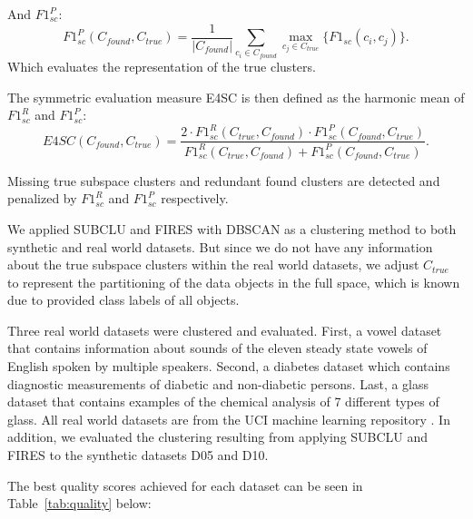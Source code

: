And $F1^{P}_{sc}$:
\begin{equation}
F1^{P}_{sc}(C_{found},C_{true}) = \frac{1}{|C_{found}|} \sum _{c_{i}\in C_{found}} \max _{c_{j}\in C_{true}} \{F1_{sc}(c_{i},c_{j})\}.
\end{equation}
Which evaluates the representation of the true clusters.  

The symmetric evaluation measure E4SC is then defined as the harmonic mean of $F1^{R}_{sc}$ and $F1^{P}_{sc}$:
\begin{equation}
E4SC(C_{found},C_{true}) = \frac{2\cdot F1^{R}_{sc}(C_{true},C_{found})\cdot F1^{P}_{sc}(C_{found},C_{true})}{F1^{R}_{sc}(C_{true},C_{found}) + F1^{P}_{sc}(C_{found},C_{true})}.
\end{equation}

Missing true subspace clusters and redundant found clusters are detected and penalized by $F1^{R}_{sc}$ and $F1^{P}_{sc}$ respectively. 

We applied SUBCLU and FIRES with DBSCAN as a clustering method to both synthetic and real world datasets. But since we do not have any information about the true subspace clusters within the real world datasets, we adjust $C_{true}$ to represent the partitioning of the data objects in the full space, which is known due to provided class labels of all objects.

Three real world datasets were clustered and evaluated. First, a vowel dataset that contains information about sounds of the eleven steady state vowels of English spoken by multiple speakers. Second, a diabetes dataset which contains diagnostic measurements of diabetic and non-diabetic persons. Last, a glass dataset that contains examples of the chemical analysis of 7 different types of glass. All real world datasets are from the UCI machine learning repository \citep{Dua:2019}. In addition, we evaluated the clustering resulting from applying SUBCLU and FIRES to the synthetic datasets D05 and D10.

The best quality scores achieved for each dataset can be seen in Table~\ref{tab:quality} below:

